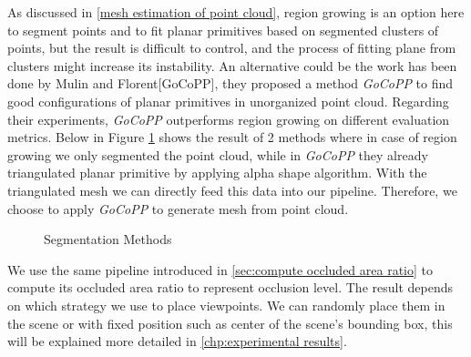 \documentclass[11pt, a4paper,oneside,chapterprefix=false]{scrbook}
\begin{document}
As discussed in \ref{mesh estimation of point cloud}, region growing is an option here to segment points and to fit planar primitives based on segmented clusters of points, but the result is difficult to control, and the process of fitting plane from clusters might increase its instability. An alternative could be the work has been done by Mulin and Florent[GoCoPP], they proposed a method \textit{GoCoPP} to find good configurations of planar primitives in unorganized point cloud. Regarding their experiments, \textit{GoCoPP} outperforms region growing on different evaluation metrics. Below in Figure \ref{segmentation results} shows the result of 2 methods where in case of region growing we only segmented the point cloud, while in \textit{GoCoPP} they already triangulated planar primitive by applying alpha shape algorithm. With the triangulated mesh we can directly feed this data into our pipeline. Therefore, we choose to apply \textit{GoCoPP} to generate mesh from point cloud.

\begin{figure}[H]
    \centering
      \label{fig:region growing} 
     \label{fig:gocopp}
    \caption{Segmentation Methods}
    \label{segmentation results}
\end{figure}

We use the same pipeline introduced in \ref{sec:compute occluded area ratio} to compute its occluded area ratio to represent occlusion level. The result depends on which strategy we use to place viewpoints. We can randomly place them in the scene or with fixed position such as center of the scene's bounding box, this will be explained more detailed in \ref{chp:experimental results}.
\end{document}
